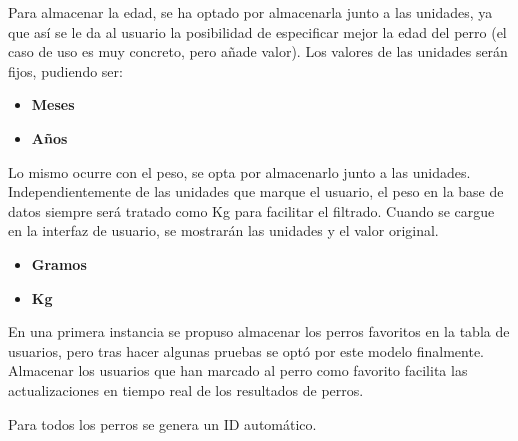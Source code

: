 \documentclass[a4paper, 12pt]{article}
\begin{document}
Para almacenar la edad, se ha optado por almacenarla junto a las unidades, ya que así se le da al usuario la posibilidad de especificar mejor la edad del perro (el caso de uso es muy concreto, pero añade valor). Los valores de las unidades serán fijos, pudiendo ser:

\begin{itemize}[noitemsep]
	\item \textbf{Meses}
	\item \textbf{Años}
\end{itemize}

Lo mismo ocurre con el peso, se opta por almacenarlo junto a las unidades. Independientemente de las unidades que marque el usuario, el peso en la base de datos siempre será tratado como Kg para facilitar el filtrado. Cuando se cargue en la interfaz de usuario, se mostrarán las unidades y el valor original.

\begin{itemize}[noitemsep]
	\item \textbf{Gramos}
	\item \textbf{Kg}
\end{itemize}

En una primera instancia se propuso almacenar los perros favoritos en la tabla de usuarios, pero tras hacer algunas pruebas se optó por este modelo finalmente. Almacenar los usuarios que han marcado al perro como favorito facilita las actualizaciones en tiempo real de los resultados de perros.

Para todos los perros se genera un ID automático.
\end{document}
